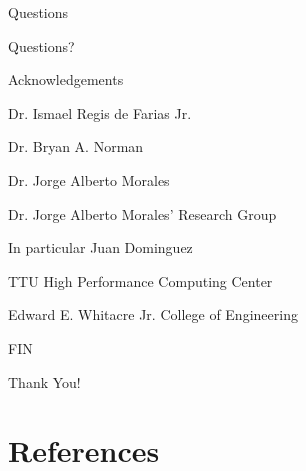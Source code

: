 \documentclass[professionalfonts]{beamer}
\newcommand{\SubItem}[1]{
    {\setlength\itemindent{15pt} \item[*] #1}
}
\begin{document}

\begin{frame}{Questions}
	\begin{center}
		\Huge Questions?
	\end{center}
\end{frame}


\begin{frame}{Acknowledgements}
	\begin{itemize}
		\item Dr. Ismael Regis de Farias Jr.
		\item Dr. Bryan A. Norman
		\item Dr. Jorge Alberto Morales
		\item Dr. Jorge Alberto Morales' Research Group
			\SubItem {In particular Juan Dominguez}
		\item TTU High Performance Computing Center
		\item Edward E. Whitacre Jr. College of Engineering
	\end{itemize}
\end{frame}


\begin{frame}{FIN}
	\begin{center}
		\Huge Thank You!
	\end{center}
\end{frame}




\section{\textbf{References}}

\end{document}
